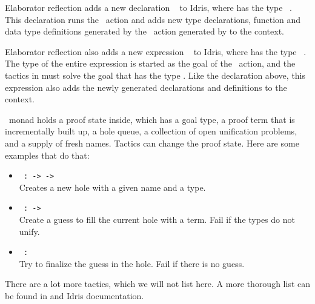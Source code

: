 Elaborator reflection adds a new declaration
\texttt{}\  to Idris,
where  has the type \ \ty{()}.
This declaration runs the \Elab\ action and adds new type declarations,
function and data type definitions generated by the \Elab\ action generated by
 to the context.

Elaborator reflection also adds a new expression
\texttt{}\  to Idris,
where  has the type \ \ty{()}.
The type  of the entire expression is started as the goal of the
\Elab\ action, and the tactics in  must solve the goal
that has the type .
Like the declaration above, this expression also adds the newly generated
declarations and definitions to the context.

\Elab\ monad holds a proof state inside, which has a goal type, a proof term that is incrementally built up, a hole queue, a collection of open unification problems, and a supply of fresh names.\cite{elabref}
Tactics can change the proof state. Here are some examples that do that:
\begin{itemize}
\item\texttt{ :  ->  ->  \IdrisType{()}}\\
Creates a new hole with a given name and a type.
\item\texttt{ :  ->  \IdrisType{()}}\\
Create a guess to fill the current hole with a term. Fail if the types do not unify.
\item\texttt{ :  \IdrisType{()}}\\
Try to finalize the guess in the hole. Fail if there is no guess.
\end{itemize}

There are a lot more tactics, which we will not list here. A more thorough list
can be found in \cite{elabref} and Idris documentation.

